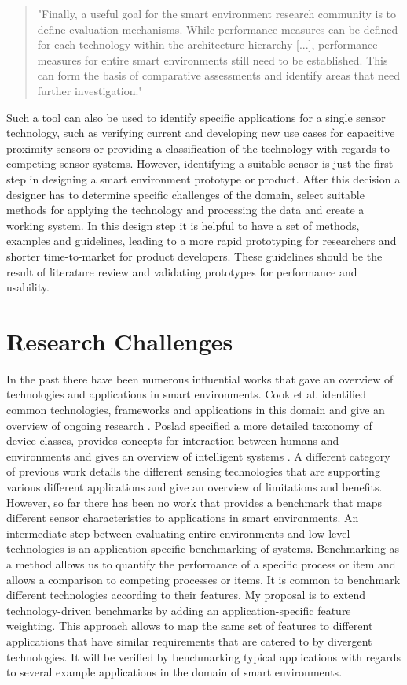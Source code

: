 \begin{quote}
"Finally, a useful goal for the smart environment research community is to define evaluation mechanisms. While performance measures can be defined for each technology within the architecture hierarchy [...], performance measures for entire smart environments still need to be established. This can form the basis of comparative assessments and identify areas that need further investigation."
\end{quote}
Such a tool can also be used to identify specific applications for a single sensor technology, such as verifying current and developing new use cases for capacitive proximity sensors or providing a classification of the technology with regards to competing sensor systems. However, identifying a suitable sensor is just the first step in designing a smart environment prototype or product. After this decision a designer has to determine specific challenges of the domain, select suitable methods for applying the technology and processing the data and create a working system. In this design step it is helpful to have a set of methods, examples and guidelines, leading to a more rapid prototyping for researchers and shorter time-to-market for product developers. These guidelines should be the result of literature review and validating prototypes for performance and usability. 

\section{Research Challenges}
In the past there have been numerous influential works that gave an overview of technologies and applications in smart environments. Cook et al. identified common technologies, frameworks and applications in this domain and give an overview of ongoing research \cite{cook2007smart}. Poslad specified a more detailed taxonomy of device classes, provides concepts for interaction between humans and environments and gives an overview of intelligent systems \cite{poslad2011ubiquitous}. A different category of previous work details the different sensing technologies that are supporting various different applications and give an overview of limitations and benefits. However, so far there has been no work that provides a benchmark that maps different sensor characteristics to applications in smart environments. An intermediate step between evaluating entire environments and low-level technologies is an application-specific benchmarking of systems. Benchmarking as a method allows us to quantify the performance of a specific process or item and allows a comparison to competing processes or items. It is common to benchmark different technologies according to their features. My proposal is to extend technology-driven benchmarks by adding an application-specific feature weighting. This approach allows to map the same set of features to different applications that have similar requirements that are catered to by divergent technologies. It will be verified by benchmarking typical applications with regards to several example applications in the domain of smart environments.

